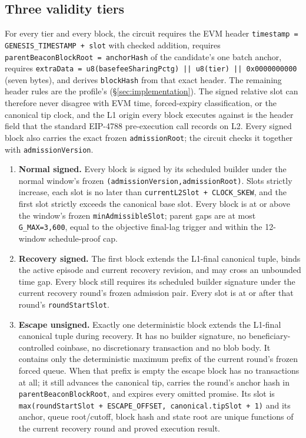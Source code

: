 \documentclass[a4paper,11pt]{article}
\newcommand{\code}[1]{\nolinkurl{#1}}
\begin{document}
\subsection{Three validity tiers}

For every tier and every block, the circuit requires the EVM header
\code{timestamp = GENESIS_TIMESTAMP + slot} with checked addition, requires
\code{parentBeaconBlockRoot = anchorHash} of the candidate's one batch anchor,
requires \code{extraData = u8(basefeeSharingPctg) || u8(tier) || 0x0000000000}
(seven bytes), and derives \code{blockHash} from that exact header.  The
remaining header rules are the profile's (\S\ref{sec:implementation}).  The
signed relative slot can therefore never disagree with EVM time, forced-expiry
classification, or the canonical tip clock, and the L1 origin every block
executes against is the header field that the standard EIP-4788 pre-execution
call records on L2.  Every signed block also carries the exact frozen
\code{admissionRoot}; the circuit checks it together with
\code{admissionVersion}.

\begin{enumerate}
\item \textbf{Normal signed.} Every block is signed by its scheduled builder
under the normal window's frozen
\code{(admissionVersion,admissionRoot)}.  Slots strictly
increase, each slot is no later than \code{currentL2Slot + CLOCK_SKEW}, and the
first slot strictly exceeds the canonical base slot.  Every block is at or
above the window's frozen \code{minAdmissibleSlot}; parent gaps are at most
\code{G_MAX=3,600}, equal to the objective final-lag trigger and within the
12-window schedule-proof cap.
\item \textbf{Recovery signed.} The first block extends the L1-final canonical
tuple, binds the active episode and current recovery revision, and may cross an
unbounded time gap.  Every block still requires its scheduled builder signature
under the current recovery round's frozen admission pair.  Every slot is at or
after that round's \code{roundStartSlot}.
\item \textbf{Escape unsigned.} Exactly one deterministic block extends the
L1-final canonical tuple during recovery.  It has no builder signature, no
beneficiary-controlled coinbase, no discretionary transaction and no blob
body.  It contains only the deterministic maximum prefix of the current
round's frozen forced queue.  When that prefix is empty the escape block has
no transactions at all; it still advances the canonical tip, carries the
round's anchor hash in \code{parentBeaconBlockRoot}, and expires every omitted
promise.  Its slot is
\code{max(roundStartSlot + ESCAPE_OFFSET, canonical.tipSlot + 1)} and its anchor,
queue root/cutoff, block hash and state root are unique functions of the current
recovery round and proved execution result.
\end{enumerate}
\end{document}
